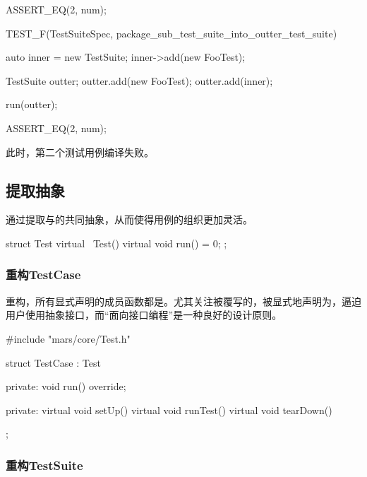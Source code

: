 \begin{content}
\begin{leftbar}
\begin{c++}[caption={\ttfamily{test/mars/core/TestSuiteSpec.cc}}]
{  ASSERT_EQ(2, num);
}

TEST_F(TestSuiteSpec, package_sub_test_suite_into_outter_test_suite) {
  auto inner = new TestSuite;
  inner->add(new FooTest);

  TestSuite outter;
  outter.add(new FooTest);
  outter.add(inner);

  run(outter);

  ASSERT_EQ(2, num);
}
 \end{c++}
\end{leftbar}

此时，第二个测试用例编译失败。

\subsection{提取抽象}

通过提取与的共同抽象，从而使得用例的组织更加灵活。

\begin{leftbar}
 \begin{c++}[caption={\ttfamily{include/mars/core/Test.h}}]
struct Test {
  virtual ~Test() {}
  virtual void run() = 0;
};
 \end{c++}
\end{leftbar}

\subsubsection{重构TestCase}

重构，所有显式声明的成员函数都是。尤其关注被覆写的，被显式地声明为，逼迫用户使用抽象接口，而“面向接口编程”是一种良好的设计原则。

\begin{leftbar}
 \begin{c++}[caption={\ttfamily{include/mars/core/TestCase.h}}]
#include "mars/core/Test.h"

struct TestCase : Test {
private:
  void run() override;

private:
  virtual void setUp() {}
  virtual void runTest() {}
  virtual void tearDown() {}
};
 \end{c++}
\end{leftbar}

\subsubsection{重构TestSuite}


\end{content}

